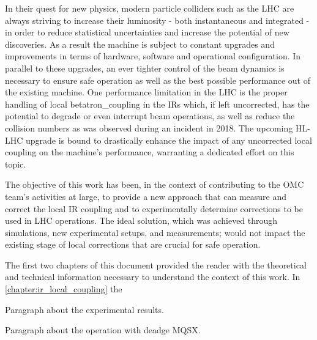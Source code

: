 In their quest for new physics, modern particle colliders such as the \gls{LHC} are always striving to increase their \gls{luminosity} - both instantaneous and integrated - in order to reduce statistical uncertainties and increase the potential of new discoveries.
As a result the machine is subject to constant upgrades and improvements in terms of hardware, software and operational configuration.
In parallel to these upgrades, an ever tighter control of the \gls{beam} dynamics is necessary to ensure safe operation as well as the best possible performance out of the existing machine.
One performance limitation in the \gls{LHC} is the proper handling of local \gls{betatron_coupling} in the \glspl{IR} which, if left uncorrected, has the potential to degrade or even interrupt beam operations, as well as reduce the collision numbers as was observed during an incident in \num{2018}.
The upcoming \gls{HL-LHC} upgrade is bound to drastically enhance the impact of any uncorrected local coupling on the machine's performance, warranting a dedicated effort on this topic.

The objective of this work has been, in the context of contributing to the \gls{OMC} team's activities at large, to provide a new approach that can measure and correct the local \gls{IR} coupling and to experimentally determine corrections to be used in LHC operations.
The ideal solution, which was achieved through simulations, new experimental setups, and measurements; would not impact the existing stage of local corrections that are crucial for safe operation.
\break

The first two chapters of this document provided the reader with the theoretical and technical information necessary to understand the context of this work.
In \cref{chapter:ir_local_coupling} the 

Paragraph about the experimental results.

Paragraph about the operation with deadge MQSX.





\glsresetall                                     %

